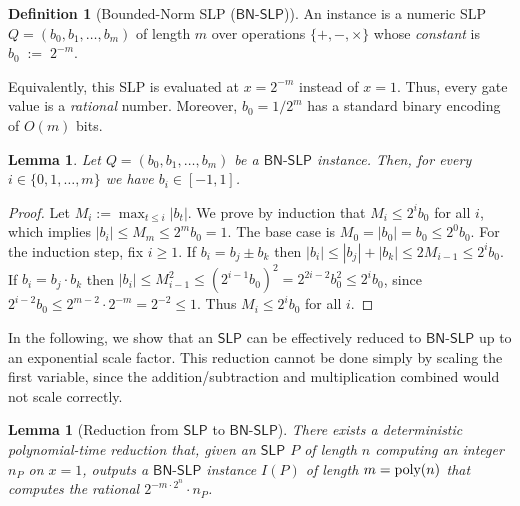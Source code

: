 \documentclass{article}
\theoremstyle{plain}
\newtheorem{lemma}[theorem]{Lemma}
\theoremstyle{definition}
\newtheorem{definition}[theorem]{Definition}
\theoremstyle{remark}
\begin{document}
\begin{definition}[Bounded-Norm SLP ($\mathsf{BN\text{-}SLP}$)]
	An instance is a numeric SLP $Q=(b_0,b_1,\ldots,b_m)$ of length $m$ over operations
	$\{+,-,\times\}$ whose \emph{constant} is
	$
	b_0 \;:=\;2^{-m}.
	$
\end{definition} Equivalently, this SLP is evaluated at $x = 2^{-m}$ instead of $x = 1$.
Thus, every gate value is a \emph{rational} number. Moreover, $b_0=1/2^m$ has a standard binary encoding of $O(m)$ bits. 

\begin{lemma}
	\label{clm:bnpslp-bounded}
	Let $Q=(b_0,b_1,\ldots,b_m)$ be a $\mathsf{BN\text{-}SLP}$ instance. Then, for every
	$i\in\{0,1,\ldots,m\}$ we have $b_i\in[-1,1]$.
\end{lemma}

\begin{proof}
	Let $M_i:=\max_{t\le i}|b_t|$. We prove by induction that $M_i\le 2^i b_0$ for all $i$,
	which implies $|b_i|\le M_m\le 2^m b_0=1$.
	The base case is $M_0=|b_0|=b_0\le 2^0 b_0$.
	For the induction step, fix $i\ge 1$. If $b_i=b_j\pm b_k$ then
	$|b_i|\le |b_j|+|b_k|\le 2M_{i-1}\le 2^i b_0$.
	If $b_i=b_j\cdot b_k$ then
	$|b_i|\le M_{i-1}^2\le (2^{i-1}b_0)^2=2^{2i-2}b_0^2\le 2^i b_0$,
	since $2^{i-2}b_0\le 2^{m-2}\cdot 2^{-m}=2^{-2}\le 1$.
	Thus $M_i\le 2^i b_0$ for all $i$.
\end{proof}

In the following, we show that an $\mathsf{SLP}$ can be effectively reduced to $\mathsf{BN\text{-}SLP}$ up to an exponential scale factor. This reduction cannot be done simply by scaling the first variable, since the addition/subtraction and multiplication combined would not scale correctly. 

\begin{lemma}[Reduction from $\mathsf{SLP}$ to $\mathsf{BN\text{-}SLP}$]
	\label{lem:posslp-to-bnpslp}
	There exists a deterministic polynomial-time reduction that, given an
	$\mathsf{SLP}$ $P$ of length $n$ computing an integer $n_P$ on $x = 1$, outputs a $\mathsf{BN\text{-}SLP}$
	instance $I(P)$ of length $m = \textnormal{poly}(n)$ that computes the rational $2^{-m \cdot 2^n} \cdot n_P$.
\end{lemma}
\end{document}

